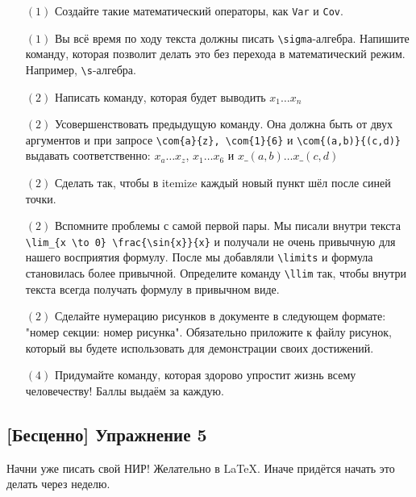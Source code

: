 \documentclass[12pt, a4paper, oneside]{article}
\begin{document}
\begin{itemize}
	\item[$(1)$] Создайте такие математический операторы, как \verb|Var| и \verb|Cov|.
	\item[$(1)$] Вы всё время по ходу текста должны писать \verb|\sigma|-алгебра. Напишите команду, которая позволит делать это без перехода в математический режим. Например,  \verb|\s|-алгебра.
	\item[$(2)$] Написать команду, которая будет выводить $x_1 \ldots x_n$
	\item[$(2)$] Усовершенствовать предыдущую команду. Она должна быть от двух аргументов и при запросе \verb|\com{a}{z}, \com{1}{6}| и \verb|\com{(a,b)}{(c,d)}| выдавать соответственно:  $x_a \ldots x_z$, 
	$x_1 \ldots x_6$ и   $x\_{(a,b)} \ldots x\_{(c,d)}$
	\item[$(2)$] Сделать так, чтобы в itemize каждый новый пункт шёл после синей точки.
	\item[$(2)$] Вспомните проблемы с самой первой пары. Мы писали внутри текста \verb|\lim_{x \to 0} \frac{\sin{x}}{x}| и получали не очень привычную для нашего восприятия формулу. После мы добавляли \verb|\limits| и формула становилась более привычной. Определите команду \verb|\llim| так, чтобы внутри текста всегда получать формулу в привычном виде.
	\item[$(2)$] Сделайте нумерацию рисунков в документе в следующем формате: "номер секции: номер рисунка". Обязательно приложите к файлу рисунок, который вы будете использовать для демонстрации своих достижений.
	\item[$(4)$]   Придумайте команду, которая здорово упростит жизнь всему человечеству! Баллы выдаём за каждую. 
\end{itemize}

\subsection*{ [Бесценно]  Упражнение 5}

Начни уже писать свой НИР! Желательно в  \LaTeX.  Иначе придётся начать это делать через неделю. 
\end{document}
